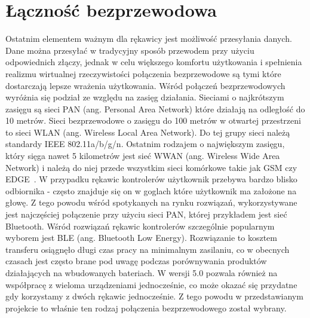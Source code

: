 \section{Łączność bezprzewodowa}
\label{sec:bvsble}
Ostatnim elementem ważnym dla rękawicy jest możliwość przesyłania danych. Dane można przesyłać w tradycyjny sposób przewodem przy użyciu odpowiednich złączy, jednak w celu większego komfortu użytkowania i spełnienia realizmu wirtualnej rzeczywistości połączenia bezprzewodowe są tymi które dostarczają lepsze wrażenia użytkowania. Wśród połączeń bezprzewodowych wyróżnia się podział ze względu na zasięg działania. Sieciami o najkrótszym zasięgu są sieci PAN (ang. Personal Area Network) które działają na odległość do 10 metrów. Sieci bezprzewodowe o zasięgu do 100 metrów w otwartej przestrzeni to sieci WLAN (ang. Wireless Local Area Network). Do tej grupy sieci należą standardy IEEE 802.11a/b/g/n. Ostatnim rodzajem o największym zasięgu, który sięga nawet 5 kilometrów jest sieć WWAN (ang. Wireless Wide Area Network) i należą do niej przede wszystkim sieci komórkowe takie jak GSM czy EDGE~\cite{sieci}. W przypadku rękawic kontrolerów użytkownik przebywa bardzo blisko odbiornika - często znajduje się on w goglach które użytkownik ma założone na głowę. Z tego powodu wśród spotykanych na rynku rozwiązań, wykorzystywane jest najczęściej połączenie przy użyciu sieci PAN, której przykładem jest sieć Bluetooth. Wśród rozwiązań rękawic kontrolerów szczególnie popularnym wyborem jest BLE (ang. Bluetooth Low Energy). Rozwiązanie to kosztem transferu osiągnęło długi czas pracy na minimalnym zasilaniu, co w obecnych czasach jest często brane pod uwagę podczas porównywania produktów działających na wbudowanych bateriach. W wersji 5.0 pozwala również na współpracę z wieloma urządzeniami jednocześnie, co może okazać się przydatne gdy korzystamy z dwóch rękawic jednocześnie. Z tego powodu w przedstawianym projekcie to właśnie ten rodzaj połączenia bezprzewodowego został wybrany.

